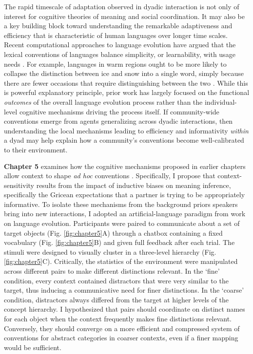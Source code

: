 \documentclass[11pt]{article}
\begin{document}
The rapid timescale of adaptation observed in dyadic interaction is not only of interest for cognitive theories of meaning and social coordination. 
It may also be a key building block toward understanding the remarkable adaptiveness and efficiency that is characteristic of human languages over longer time scales.
Recent computational approaches to language evolution have argued that the lexical conventions of languages balance simplicity, or learnability, with usage needs \cite{WintersKirbySmith14_LanguagesAdapt,RegierKempKay15_WordMeaningsEfficientCommunication,KirbyTamarizCornishSmith15_CompressionCommunication,gibson2019efficiency}. 
For example, languages in warm regions ought to be more likely to collapse the distinction between ice and snow into a single word, simply because there are fewer occasions that require distinguishing between the two . 
While this is powerful explanatory principle, prior work has largely focused on the functional \emph{outcomes} of the overall language evolution process rather than the individual-level cognitive mechanisms driving the process itself.
If community-wide conventions emerge from agents generalizing across dyadic interactions, then understanding the local mechanisms leading to efficiency and informativity \emph{within} a dyad may help explain how a community’s conventions become well-calibrated to their environment. 


\textbf{Chapter 5} examines how the cognitive mechanisms proposed in earlier chapters allow context to shape \emph{ad hoc} conventions \cite{hawkins_emerging_abstractions_2018}.
Specifically, I propose that context-sensitivity results from the impact of inductive biases on meaning inference, specifically the Gricean expectations that a partner is trying to be appropriately informative.
To isolate these mechanisms from the background priors speakers bring into new interactions, I adopted an artificial-language paradigm from work on language evolution.
Participants were paired to communicate about a set of target objects (Fig. \ref{fig:chapter5}A) through a chatbox containing a fixed vocabulary (Fig. \ref{fig:chapter5}B) and given full feedback after each trial.
The stimuli were designed to visually cluster in a three-level hierarchy (Fig. \ref{fig:chapter5}C).
Critically, the statistics of the environment were manipulated across different pairs to make different distinctions relevant. 
In the `fine' condition, every context contained distractors that were very similar to the target, thus inducing a communicative need for finer distinctions. 
In the `coarse' condition, distractors always differed from the target at higher levels of the concept hierarchy.  
I hypothesized that pairs should coordinate on distinct names for each object when the context frequently makes fine distinctions relevant. 
Conversely, they should converge on a more efficient and compressed system of conventions for abstract categories in coarser contexts, even if a finer mapping would be sufficient.
\end{document}
